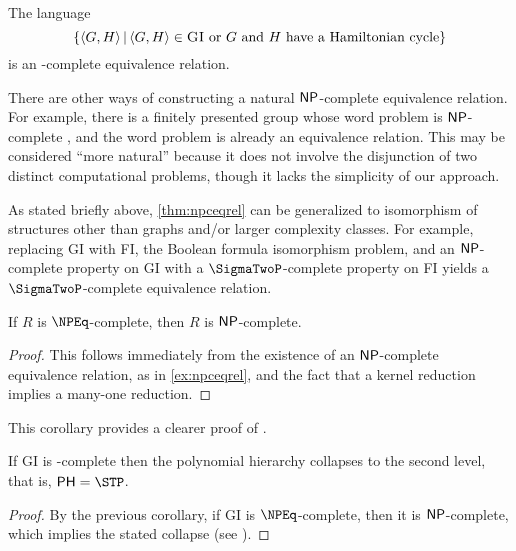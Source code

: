 \begin{example}\label{ex:npceqrel}
  The language
  \begin{equation*}
    \left\{ \langle G,H\rangle \, \middle| \, \langle G,H\rangle \in \textsc{GI} \text{ or } G \text{ and } H \text{ have a Hamiltonian cycle}  \right\}
  \end{equation*}
  is an \NP-complete equivalence relation.
\end{example}

There are other ways of constructing a natural ${\mathsf{NP}}$-complete equivalence relation.
For example, there is a finitely presented group whose word problem is ${\mathsf{NP}}$-complete \autocite[Corollary~1.1]{sbr02}, and the word problem is already an equivalence relation.
This may be considered ``more natural'' because it does not involve the disjunction of two distinct computational problems, though it lacks the simplicity of our approach.

\begin{example}
  As stated briefly above, \autoref{thm:npceqrel} can be generalized to isomorphism of structures other than graphs and/or larger complexity classes.
  For example, replacing \textsc{GI} with \textsc{FI}, the Boolean formula isomorphism problem, and an ${\mathsf{NP}}$-complete property on \textsc{GI} with a $\SigmaTwoP$-complete property on \textsc{FI} yields a $\SigmaTwoP$-complete equivalence relation.
\end{example}

\begin{corollary}
  If $R$ is $\NPEq$-complete, then $R$ is ${\mathsf{NP}}$-complete.
\end{corollary}
\begin{proof}
  This follows immediately from the existence of an ${\mathsf{NP}}$-complete equivalence relation, as in \autoref{ex:npceqrel}, and the fact that a kernel reduction implies a many-one reduction.
\end{proof}

This corollary provides a clearer proof of \autocite[Proposition~8.1]{bcffm}.

\begin{corollary}
  If \textsc{GI} is \NPEq-complete then the polynomial hierarchy collapses to the second level, that is, $\PH = \STP$.
\end{corollary}
\begin{proof}
  By the previous corollary, if \textsc{GI} is $\NPEq$-complete, then it is ${\mathsf{NP}}$-complete, which implies the stated collapse (see \autocite{schoning87}).
\end{proof}

